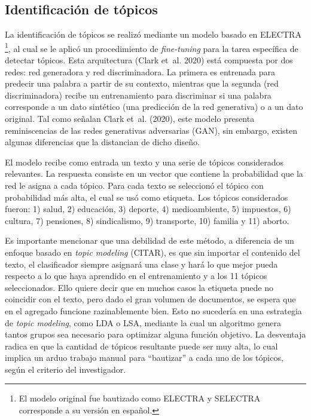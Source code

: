 \documentclass[
  12pt,
]{article}
\begin{document}
\hypertarget{identificaciuxf3n-de-tuxf3picos}{%
\subsection{Identificación de
tópicos}\label{identificaciuxf3n-de-tuxf3picos}}

La identificación de tópicos se realizó mediante un modelo basado en
ELECTRA
\footnote{El modelo original fue bautizado como ELECTRA y SELECTRA corresponde a su versión en español.},
al cual se le aplicó un procedimiento de \emph{fine-tuning} para la
tarea específica de detectar tópicos. Esta arquitectura (Clark et~al.
2020) está compuesta por dos redes: red generadora y red discriminadora.
La primera es entrenada para predecir una palabra a partir de su
contexto, mientras que la segunda (red discriminadora) recibe un
entrenamiento para discriminar si una palabra corresponde a un dato
sintético (una predicción de la red generativa) o a un dato original.
Tal como señalan Clark et~al. (2020), este modelo presenta
reminiscencias de las redes generativas adversarias (GAN), sin embargo,
existen algunas diferencias que la distancian de dicho diseño.

El modelo recibe como entrada un texto y una serie de tópicos
considerados relevantes. La respuesta consiste en un vector que contiene
la probabilidad que la red le asigna a cada tópico. Para cada texto se
seleccionó el tópico con probabilidad más alta, el cual se usó como
etiqueta. Los tópicos considerados fueron: 1) salud, 2) educación, 3)
deporte, 4) medioambiente, 5) impuestos, 6) cultura, 7) pensiones, 8)
sindicalismo, 9) transporte, 10) familia y 11) aborto.

Es importante mencionar que una debilidad de este método, a diferencia
de un enfoque basado en \emph{topic modeling} (CITAR), es que sin
importar el contenido del texto, el clasificador siempre asignará una
clase y hará lo que mejor pueda respecto a lo que haya aprendido en el
entrenamiento y a los 11 tópicos seleccionados. Ello quiere decir que en
muchos casos la etiqueta puede no coincidir con el texto, pero dado el
gran volumen de documentos, se espera que en el agregado funcione
razinablemente bien. Esto no sucedería en una estrategia de \emph{topic
modeling}, como LDA o LSA, mediante la cual un algoritmo genera tantos
grupos sea necesario para optimizar alguna función objetivo. La
desventaja radica en que la cantidad de tópicos resultante puede ser muy
alta, lo cual implica un arduo trabajo manual para ``bautizar'' a cada
uno de los tópicos, según el criterio del investigador.
\end{document}
